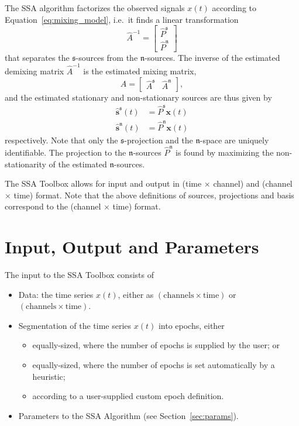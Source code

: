 \documentclass{article}
\newcommand{\1}{\ensuremath{\mathds{1}}}
\newcommand{\s}{\ensuremath{\mathfrak{s}}}
\newcommand{\n}{\ensuremath{\mathfrak{n}}}
\newcommand{\0}{\ensuremath{0}}
\begin{document}
The SSA algorithm factorizes the observed signals $x(t)$ according to
Equation~\ref{eq:mixing_model}, i.e.~it finds a linear transformation
\begin{equation}
\label{eq:est_demixing}
  \hat{A}^{-1} = \begin{bmatrix} \hat{P}^{\s} \\ \hat{P}^{\n} \end{bmatrix}
\end{equation}
that separates the \s-sources from the \n-sources. The inverse of the estimated 
demixing matrix $\hat{A}^{-1}$ is the estimated mixing matrix, 
\begin{equation}
\label{eq:est_mixing}
 \hat{A} = \begin{bmatrix} \hat{A}^{\s} & \hat{A}^{\n} \end{bmatrix}, 
\end{equation}
and the estimated stationary and non-stationary sources are thus given by
\begin{align}
\label{eq:est_s_sources}
  \hat{\mathbf s}^{\s}(t) & = \hat{P}^{\s} {\mathbf x}(t) \\
\label{eq:est_n_sources}
  \hat{\mathbf s}^{\n}(t) & = \hat{P}^{\n} {\mathbf x}(t) 
\end{align}
respectively.
Note that only the $\s$-projection and the $\n$-space are uniquely identifiable.
The projection to the \n-sources $\hat P^{\n}$ is found by maximizing the non-stationarity
of the estimated \n-sources.

The SSA Toolbox allows for input and output in (time $\times$ channel) and 
(channel $\times$ time) format. Note that the above definitions of sources, 
projections and basis correspond to the (channel $\times$ time) format.

\section{Input, Output and Parameters}

The input to the SSA Toolbox consists of
\begin{itemize}
 \item Data: the time series $x(t)$, either as $(\text{channels} \times \text{time})$ or 
				$(\text{channels} \times \text{time})$.

 \item Segmentation of the time series $x(t)$ into epochs, either
	\begin{itemize}
	  \item equally-sized, where the number of epochs is supplied by the user; or 

		\item equally-sized, where the number of epochs is set automatically by a heuristic; 

	  \item according to a user-supplied custom epoch definition. 
	\end{itemize}

 \item Parameters to the SSA Algorithm (see Section~\ref{sec:params}).
\end{itemize}
\end{document}
